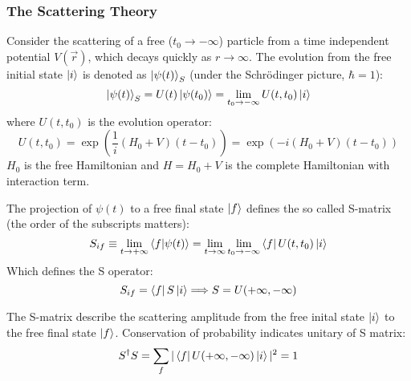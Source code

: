 \subsubsection{The Scattering Theory}
Consider the scattering of a free ($t_0 \rightarrow -\infty$) particle from a 
time independent potential $V(\vec{r})$, 
which decays quickly as $r \rightarrow \infty$. The evolution from the free initial state
$\ket{i}$ is denoted as $\ket{\psi(t)}_S$ (under the Schr\"odinger picture, $\hbar = 1$):
\begin{equation}
    \ket{\psi(t)}_S = U(t)\ket{\psi(t_0)} = \lim_{t_0 \rightarrow -\infty}U(t, t_0)\ket{i}
\end{equation}
where $U(t, t_0)$ is the evolution operator:
\begin{equation}
    U(t, t_0) = \exp(\frac{1}{i}(H_0 + V)(t - t_0)) = \exp(-i(H_0 + V)(t-t_0))
\end{equation}
$H_0$ is the free Hamiltonian and $H = H_0 + V$ is the complete Hamiltonian
with interaction term. 

The projection of $\psi(t)$ to a free final state $\ket{f}$ defines the so called
S-matrix (the order of the subscripts matters):
\begin{equation}
    S_{if} \equiv \lim_{t\rightarrow +\infty}\bra{f}\ket{\psi(t)} 
    = \lim_{t\rightarrow\infty} \lim_{t_0 \rightarrow -\infty} \bra{f} U(t, t_0) \ket{i}
\end{equation}
Which defines the S operator:
\begin{equation}
    S_{if} = \bra{f} S \ket{i} \Longrightarrow S = U(+\infty, -\infty)
\end{equation}

The S-matrix describe the scattering amplitude from the free inital state $\ket{i}$
to the free final state $\ket{f}$. Conservation of probability indicates
unitary of S matrix:
\begin{equation}
    S^\dag S = \sum_f |\bra{f} U(+\infty, -\infty) \ket{i}|^2 = 1
\end{equation}

